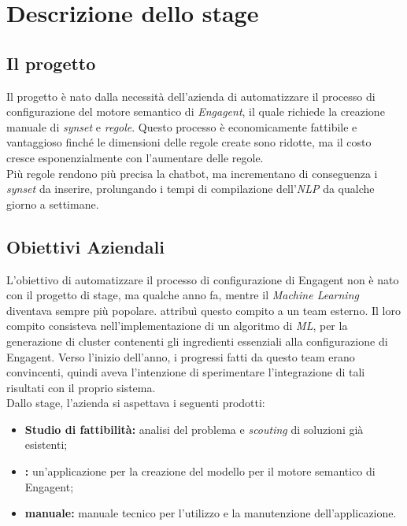 
\chapter{Descrizione dello stage}
\label{cap:descrizione-stage}

\section{Il progetto}\label{sec:progetto}

Il progetto è nato dalla necessità dell'azienda \company{} di automatizzare il processo di configurazione del motore semantico di \emph{Engagent}\glsfirstoccur{}, il quale richiede la creazione manuale di \emph{synset}\glsfirstoccur{} e \emph{regole}\glsfirstoccur{}. Questo processo è economicamente fattibile e vantaggioso finché le dimensioni delle regole create sono ridotte, ma il costo cresce esponenzialmente con l'aumentare delle regole.\\
Più regole rendono più precisa la chatbot, ma incrementano di conseguenza i \emph{synset}\glsfirstoccur{} da inserire, prolungando i tempi di compilazione dell'\emph{NLP}\glsfirstoccur{} da qualche giorno a settimane.

\section{Obiettivi Aziendali}
L'obiettivo di automatizzare il processo di configurazione di Engagent non è nato con il progetto di stage, ma qualche anno fa, mentre il \textit{Machine Learning} diventava sempre più popolare. \company{} attribuì questo compito a un team esterno. Il loro compito consisteva nell'implementazione di un algoritmo di \textit{ML}, per la generazione di cluster contenenti gli ingredienti essenziali alla configurazione di Engagent.
Verso l'inizio dell'anno, i progressi fatti da questo team erano convincenti, quindi \company{} aveva l'intenzione di sperimentare l'integrazione di tali risultati con il proprio sistema.\\
Dallo stage, l'azienda si aspettava i seguenti prodotti:
\begin{itemize}
    \item \textbf{Studio di fattibilità:} analisi del problema e \textit{scouting}\glsfirstoccur{} di soluzioni già esistenti;
    \item \textbf{\app{}:} un'applicazione per la creazione del modello per il motore semantico di Engagent;
    \item \textbf{manuale:} manuale tecnico per l'utilizzo e la manutenzione dell'applicazione.    
\end{itemize}
